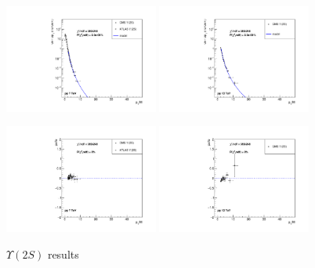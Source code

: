 \documentclass{article}
\begin{document}
\begin{figure}
\centering
\includegraphics[width = 0.45\textwidth]{ups2S_cs.pdf}
\includegraphics[width = 0.45\textwidth]{ups2S_cs_13.pdf}

\includegraphics[width = 0.45\textwidth]{ups2S_pull.pdf}
\includegraphics[width = 0.45\textwidth]{ups2S_pull_13.pdf}
\caption{$\Upsilon(2S)$ results}
\end{figure}

\clearpage
\end{document}
